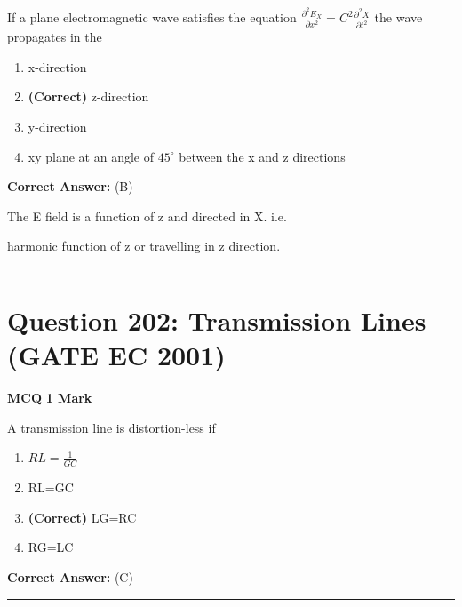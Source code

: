 \documentclass[11pt,a4paper]{article}
\begin{document}
\noindent If a plane electromagnetic wave satisfies the equation $\frac{\partial^2 E_{X}}{\partial x^2}=C^{2}\frac{\partial^2X }{\partial t^2}$ the wave propagates in the


\begin{enumerate}[label=(\Alph*)]
    \item x-direction
    \item \textbf{(Correct)} z-direction
    \item y-direction
    \item xy plane at an angle of $45^{\circ}$
between the x and z directions
\end{enumerate}

\noindent \textbf{Correct Answer:} (B)

\begin{tcolorbox}[solbox, title=Detailed Solution -- Question 201]
The E field is a function of z and directed in X. i.e.

harmonic function of z or travelling in z direction.
\end{tcolorbox}

\vspace{1.5em}
\hrule
\vspace{1.5em}

\section*{Question 202: Transmission Lines (GATE EC 2001)}
\noindent \textbf{\color{primary}MCQ} \hfill \textbf{\color{secondary}1 Mark}


\noindent A transmission line is distortion-less if


\begin{enumerate}[label=(\Alph*)]
    \item $RL=\frac{1}{GC}$
    \item RL=GC
    \item \textbf{(Correct)} LG=RC
    \item RG=LC
\end{enumerate}

\noindent \textbf{Correct Answer:} (C)


\vspace{1.5em}
\hrule
\vspace{1.5em}
\end{document}
